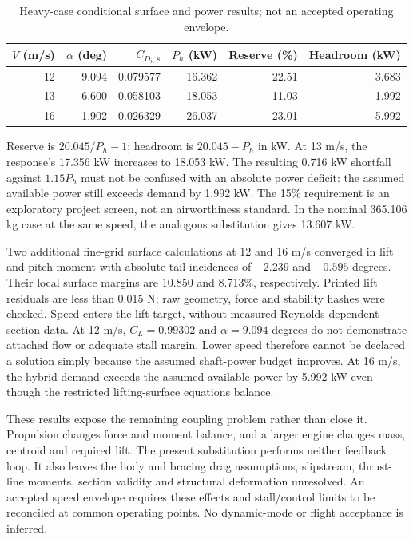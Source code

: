 \documentclass[10pt,letterpaper]{article}
\begin{document}
\begin{table}[htbp]
\centering\small
\caption{Heavy-case conditional surface and power results; not an accepted operating envelope.}
\label{tab:v16_speed_power}
\begin{tabular}{rrrrrr}
\hline
$V$ (m/s)&$\alpha$ (deg)&$C_{D_i,s}$&$P_h$ (kW)&Reserve (\%)&Headroom (kW)\\
\hline
12 & 9.094 & 0.079577 & 16.362 & 22.51 & 3.683\\
13 & 6.600 & 0.058103 & 18.053 & 11.03 & 1.992\\
16 & 1.902 & 0.026329 & 26.037 & -23.01 & -5.992\\
\hline
\end{tabular}
\end{table}

Reserve is $20.045/P_h-1$; headroom is $20.045-P_h$ in kW. At 13 m/s,
the response's 17.356 kW increases to 18.053 kW. The resulting 0.716 kW shortfall
against $1.15P_h$ must not be confused with an absolute power deficit: the assumed
available power still exceeds demand by 1.992 kW. The 15\% requirement is an
exploratory project screen, not an airworthiness standard. In the nominal
365.106 kg case at the same speed, the analogous substitution gives 13.607 kW.

Two additional fine-grid surface calculations at 12 and 16 m/s converged in lift
and pitch moment with absolute tail incidences of $-2.239$ and $-0.595$ degrees.
Their local surface margins are 10.850 and 8.713\%, respectively. Printed lift
residuals are less than 0.015 N; raw geometry, force and stability hashes were
checked. Speed enters the lift target, without measured Reynolds-dependent
section data. At 12 m/s, $C_L=0.99302$ and $\alpha=9.094$ degrees do not demonstrate
attached flow or adequate stall margin. Lower speed therefore cannot be declared
a solution simply because the assumed shaft-power budget improves. At 16 m/s,
the hybrid demand exceeds the assumed available power by 5.992 kW even though
the restricted lifting-surface equations balance.

These results expose the remaining coupling problem rather than close it.
Propulsion changes force and moment balance, and a larger engine changes mass,
centroid and required lift. The present substitution performs neither feedback
loop. It also leaves the body and bracing drag assumptions, slipstream, thrust-line
moments, section validity and structural deformation unresolved. An accepted
speed envelope requires these effects and stall/control limits to be reconciled
at common operating points. No dynamic-mode or flight acceptance is inferred.
\end{document}
